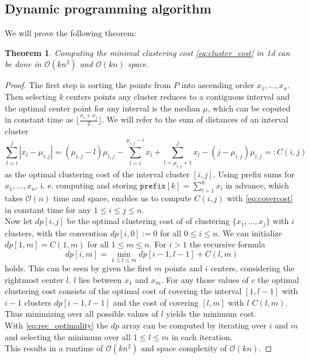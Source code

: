 \documentclass[a4paper,12pt,headsepline]{scrartcl}
\newtheorem{theorem}{Theorem}
\begin{document}
\subsection{Dynamic programming algorithm}
We will prove the following theorem:
\begin{theorem}\label{thm:kcenter}
    Computing the minimal clustering cost \eqref{eq:cluster_cost} in 1d can be done
    in $\mathcal O (kn^2)$ and $\mathcal O (kn)$ space.
\end{theorem}
\begin{proof}
The first step is sorting the points from $P$ into ascending order $x_1, \dots, x_n$. Then selecting $k$ centers points
any cluster reduces to a contiguous interval and the optimal center point for any interval
is the median $\mu$, which can be coputed in constant time as $\lfloor\frac{x_i + x_j}{2}\rfloor$. We will refer to the sum of distances of an interval cluster 
\begin{equation}\label{eq:covercost}
    \sum_{l = i}^j|x_l - \mu_{i,j}| = (\mu_{i,j}-l)\mu_{i,j} - \sum_{l = i}^{\mu_{i,j}-i}x_l + \sum_{l = \mu_{i,j}+1}^{j}x_l - (j -\mu_{i,j})\mu_{i,j}   =: C(i,j)
\end{equation}
as the optimal clustering cost of the interval cluster $[i,j]$. Using prefix sums for $x_1, \dots, x_n$, 
i. e. computing and storing $\texttt{prefix}[k] = \sum_{l=1}^k x_l$ in advance, which takes $\mathcal O(n)$ time and space,
enables us to compute $C(i,j)$ with \eqref{eq:covercost} in constant time for any $1\leq i\leq j\leq n$.\\
Now let $dp[i,j]$ be the optimal clustering cost of of clustering $\{x_1, \dots, x_j\}$
with $i$ clusters, with the convention $dp[i,0]:=0$ for all $0 \leq i \leq n$. We can initialize $dp[1, m] = C(1, m)$ for all $1 \leq m \leq n$.
For $i > 1$ the recursive formula
\begin{equation}\label{eq:rec_optimality}
    dp[i, m] = \min_{1\leq l \leq m} dp[i-1, l-1] + C(l, m)
\end{equation}
holds. This can be seen by given the first $m$ points and $i$ centers, considering the
rightmost center $l$. $l$ lies between $x_1$ and $x_m$. For any those values of $c$
the optimal clustering cost consists of the optimal cost of covering the interval
$[1, l-1]$ with $i-1$ clusters $dp[i-1, l-1]$ and the cost of covering $[l, m]$ with $l$ 
$C(l, m)$. Thus minimizing over all possible values of $l$ yields the minimum cost.\\
With \eqref{eq:rec_optimality} the $dp$ array can be computed by iterating over $i$ and $m$ and 
selecting the minimum over all $1 \leq l \leq m$ in each iteration.\\
This results in a runtime of $\mathcal O(k n^2)$ and space complexity of $\mathcal O(kn)$.

\end{proof}
\end{document}
